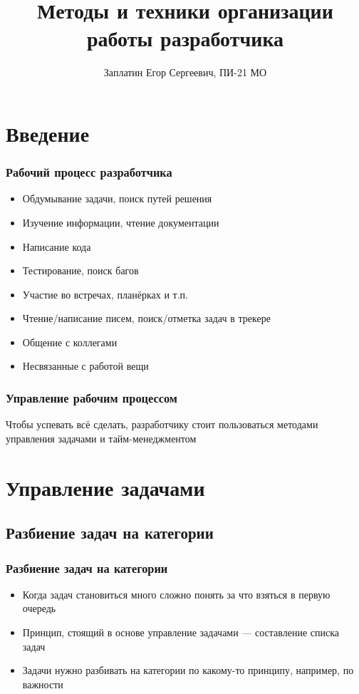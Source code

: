 \documentclass{../industrial-development}
\title{Методы и техники организации работы разработчика}
\author{Заплатин Егор Сергеевич, ПИ-21 МО}
\date{}
\begin{document}
\begin{frame}
  \titlepage
\end{frame}

\section{Введение}

\begin{frame} \frametitle{Рабочий процесс разработчика}
  \begin{itemize}
  \item Обдумывание задачи, поиск путей решения
  \item Изучение информации, чтение документации
  \item Написание кода
  \item Тестирование, поиск багов
  \item Участие во встречах, планёрках и т.п.
  \item Чтение/написание писем, поиск/отметка задач в трекере
  \item Общение с коллегами
  \item Несвязанные с работой вещи
  \end{itemize}
\end{frame}

\begin{frame} \frametitle{Управление рабочим процессом}
  \begin{block}{}
    Чтобы успевать всё сделать, разработчику стоит пользоваться методами управления задачами и тайм-менеджментом
  \end{block}
\end{frame}

\section{Управление задачами}

\subsection{Разбиение задач на категории}

\begin{frame} \frametitle{Разбиение задач на категории}

  \begin{itemize}
  \item Когда задач становиться много сложно понять за что взяться в первую очередь
  \item Принцип, стоящий в основе управление задачами --- составление списка задач
  \item Задачи нужно разбивать на категории по какому-то принципу, например, по важности
  \end{itemize}
\end{frame}
\end{document}
